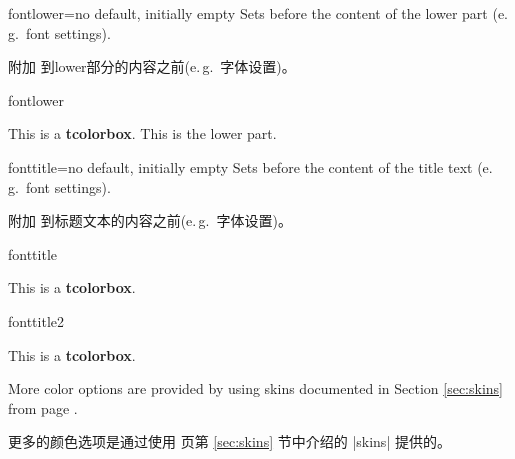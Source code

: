\begin{docTcbKey}{fontlower}{=}{no default, initially empty}
Sets  before the content of the lower part (e.\,g.\ font settings).

附加  到lower部分的内容之前(e.\,g.\ 字体设置)。
\begin{exdispExample}{fontlower}
\begin{tcolorbox}[fontlower=\sffamily\bfseries]
This is a \textbf{tcolorbox}.
\tcblower
This is the lower part.
\end{tcolorbox}
\end{exdispExample}
\end{docTcbKey}


\begin{docTcbKey}{fonttitle}{=}{no default, initially empty}
Sets  before the content of the title text (e.\,g.\ font settings).

附加  到标题文本的内容之前(e.\,g.\ 字体设置)。
\begin{exdispExample}{fonttitle}
\begin{tcolorbox}[fonttitle=\sffamily\bfseries\large,title=Hello]
This is a \textbf{tcolorbox}.
\end{tcolorbox}
\end{exdispExample}
\begin{exdispExample}{fonttitle2}
\begin{tcolorbox}[fonttitle=只加了文字,title=Hello]
This is a \textbf{tcolorbox}.
\end{tcolorbox}
\end{exdispExample}
\end{docTcbKey}

\bigskip
\begin{marker}
More color options are provided by using skins documented in
Section \ref{sec:skins} from page \pageref{sec:skins}.

更多的颜色选项是通过使用 \pageref{sec:skins} 页第 \ref{sec:skins} 节中介绍的 |skins| 提供的。
\end{marker}